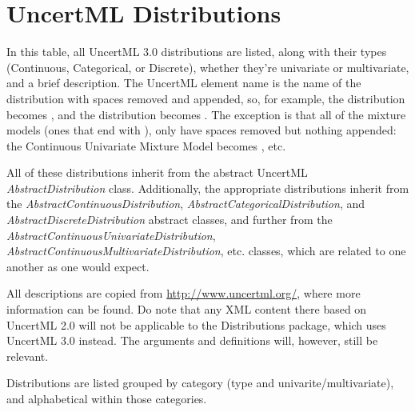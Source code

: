 \documentclass[draftspec]{sbmlpkgspec}
\newcommand{\distrib}{Distributions\xspace}
\begin{document}

\section{UncertML Distributions}
\label{sec:uncertml-distributions}

\begin{blockChanged}
In this table, all UncertML 3.0 distributions are listed, along with their types (Continuous, Categorical, or Discrete), whether they're univariate or multivariate, and a brief description.  The UncertML element name is the name of the distribution with spaces removed and  appended, so, for example, the  distribution becomes , and the  distribution becomes .  The exception is that all of the mixture models (ones that end with ), only have spaces removed but nothing appended:  the Continuous Univariate Mixture Model becomes , etc.

All of these distributions inherit from the abstract UncertML \emph{AbstractDistribution} class.  Additionally, the appropriate distributions inherit from the \emph{AbstractContinuousDistribution}, \emph{AbstractCategoricalDistribution}, and \emph{AbstractDiscreteDistribution} abstract classes, and further from the \emph{AbstractContinuousUnivariateDistribution}, \emph{AbstractContinuousMultivariateDistribution}, etc. classes, which are related to one another as one would expect.

All descriptions are copied from \url{http://www.uncertml.org/}, where more information can be found.  Do note that any XML content there based on UncertML 2.0 will not be applicable to the \distrib package, which uses UncertML 3.0 instead.  The arguments and definitions will, however, still be relevant.

Distributions are listed grouped by category (type and univarite/multivariate), and alphabetical within those categories.


\end{blockChanged}
\end{document}
